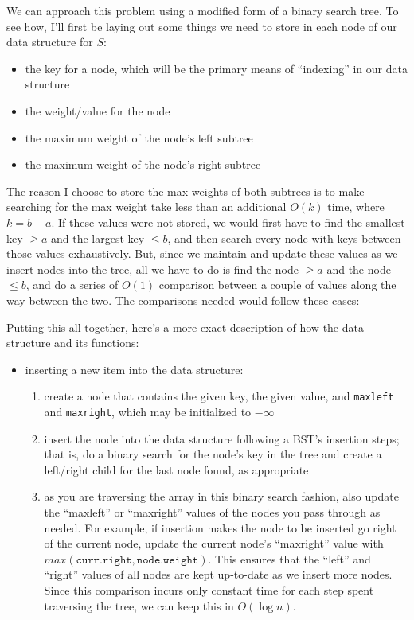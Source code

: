 \documentclass[12pt]{article}
\begin{document}
\begin{enumerate}
    We can approach this problem using a modified form of a binary search tree. To see how, I'll first be laying out 
    some things we need to store in each node of our data structure for $S$:

    \begin{itemize}
        \item the key for a node, which will be the primary means of ``indexing'' in our data structure
        \item the weight/value for the node
        \item the maximum weight of the node's left subtree
        \item the maximum weight of the node's right subtree
    \end{itemize}

    The reason I choose to store the max weights of both subtrees is to make searching for the max weight 
    take less than an additional $O(k)$ time, where $k = b - a$. If these values were not stored, we would first 
    have to find the smallest key $\geq a$ and the largest key $\leq b$, and then search every node with keys 
    between those values exhaustively. But, since we maintain and update these values as we insert nodes into the 
    tree, all we have to do is find the node $\geq a$ and the node $\leq b$, and do a series of $O(1)$ comparison between 
    a couple of values along the way between the two. The comparisons needed would follow these cases:

    Putting this all together, here's a more exact description of how the data structure and its functions:

    \begin{itemize}
        \item inserting a new item into the data structure:
        \begin{enumerate}
            \item create a node that contains the given key, the given value, and \texttt{maxleft} and \texttt{maxright}, which 
            may be initialized to $-\infty$
            \item insert the node into the data structure following a BST's insertion steps; that is, do a binary search 
            for the node's key in the tree and create a left/right child for the last node found, as appropriate
            \item as you are traversing the array in this binary search fashion, also update the ``maxleft'' or ``maxright'' values 
            of the nodes you pass through as needed. For example, if insertion makes the node to be inserted go right of the current node, 
            update the current node's ``maxright'' value with $max(\texttt{curr.right}, \texttt{node.weight})$. This 
            ensures that the ``left'' and ``right'' values of all nodes are kept up-to-date as we insert more nodes. 
            Since this comparison incurs only constant time for each step spent traversing the tree, we can keep this in 
            $O(\log n)$.
        \end{enumerate}


\end{itemize}
\end{enumerate}
\end{document}
